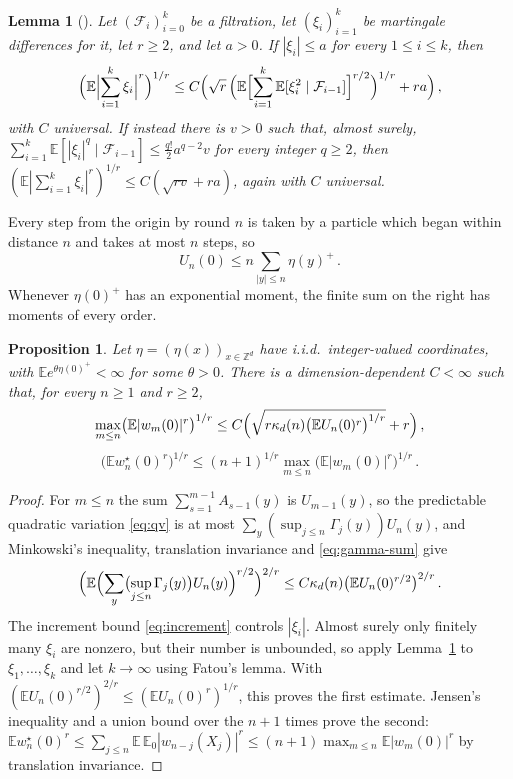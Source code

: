 \documentclass[11pt]{amsart}
\theoremstyle{plain}
\newtheorem{proposition}[theorem]{Proposition}
\newtheorem{lemma}[theorem]{Lemma}
\theoremstyle{definition}
\newcommand{\Z}{\mathbb{Z}}
\newcommand{\E}{\mathbb{E}}
\begin{document}
\begin{lemma}[{\citealp[Theorems~4.1 and~3.3]{Pinelis}}]\label{lem:bernstein}
	Let $(\mathcal F_i)_{i=0}^k$ be a filtration, let $(\xi_i)_{i=1}^k$ be
	martingale differences for it, let $r\geq2$, and let $a>0$. If
	$|\xi_i|\leq a$ for every $1\leq i\leq k$, then
	\[
		\Bigl(\E\Bigl|\sum_{i=1}^k\xi_i\Bigr|^r\Bigr)^{1/r}\leq
		C\Bigl(\sqrt r\,\Bigl(\E\Bigl[\sum_{i=1}^k
		\E[\xi_i^2\mid\mathcal F_{i-1}]\Bigr]^{r/2}\Bigr)^{1/r}+ra\Bigr)\,,
	\]
	with $C$ universal. If instead there is $v>0$ such that, almost surely,
	$\sum_{i=1}^k\E[|\xi_i|^q\mid\mathcal F_{i-1}]\leq\tfrac{q!}{2}a^{q-2}v$
	for every integer $q\geq2$, then
	$(\E|\sum_{i=1}^k\xi_i|^r)^{1/r}\leq C(\sqrt{rv}+ra)$, again with $C$ universal.
\end{lemma}

Every step from the origin by round $n$ is taken by a particle which began within distance $n$ and takes at most $n$ steps, so
\begin{equation}\label{eq:apriori-finite}
	U_n(0)\leq n\sum_{|y|\leq n}\eta(y)^+\,.
\end{equation}
Whenever $\eta(0)^+$ has an exponential moment, the finite sum on the
right has moments of every order.

\begin{proposition}\label{prop:w-moment}
	Let $\eta=(\eta(x))_{x\in\Z^d}$ have i.i.d.\ integer-valued coordinates,
	with $\E e^{\theta\eta(0)^+}<\infty$ for some $\theta>0$. There is a
	dimension-dependent $C<\infty$ such that, for every $n\geq1$ and $r\geq2$,
	\[
		\max_{m\leq n}\bigl(\E|w_m(0)|^r\bigr)^{1/r}
		\leq C\Bigl(\sqrt{r\kappa_d(n)\bigl(\E U_n(0)^r\bigr)^{1/r}}
		+r\Bigr)\,,
	\]
	\[
		\bigl(\E w_n^\star(0)^r\bigr)^{1/r}
		\leq(n+1)^{1/r}\max_{m\leq n}\bigl(\E|w_m(0)|^r\bigr)^{1/r}\,.
	\]
\end{proposition}

\begin{proof}
	For $m\leq n$ the sum $\sum_{s=1}^{m-1}A_{s-1}(y)$ is $U_{m-1}(y)$, so the
	predictable quadratic variation \eqref{eq:qv} is at most
	$\sum_y(\sup_{j\leq n}\Gamma_j(y))U_n(y)$, and Minkowski's inequality,
	translation invariance and \eqref{eq:gamma-sum} give
	\[
		\Bigl(\E\Bigl(\sum_y\bigl(\sup_{j\leq n}\Gamma_j(y)\bigr)U_n(y)\Bigr)^{r/2}\Bigr)^{2/r}
		\leq C\kappa_d(n)\bigl(\E U_n(0)^{r/2}\bigr)^{2/r}\,.
	\]
	The increment bound
	\eqref{eq:increment} controls $|\xi_i|$. Almost surely only finitely many
	$\xi_i$ are nonzero, but their number is unbounded, so apply
	Lemma~\ref{lem:bernstein} to $\xi_1,\ldots,\xi_k$ and let $k\to\infty$ using
	Fatou's lemma. With $(\E U_n(0)^{r/2})^{2/r}\leq(\E U_n(0)^r)^{1/r}$, this
	proves the first estimate. Jensen's inequality and a union bound over the
	$n+1$ times prove the second:
	$\E w_n^\star(0)^r\leq\sum_{j\leq n}\E\,\E_0|w_{n-j}(X_j)|^r
	\leq(n+1)\max_{m\leq n}\E|w_m(0)|^r$ by translation invariance.
\end{proof}
\end{document}
